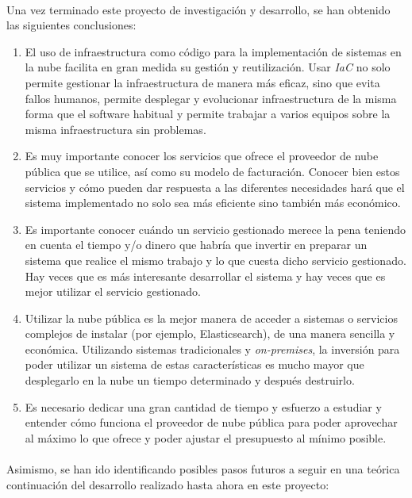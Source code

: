 \documentclass[../../memoria.tex]{subfiles}
\begin{document}
\paragraph{}
Una vez terminado este proyecto de investigación y desarrollo, se han obtenido las siguientes conclusiones:
\begin{enumerate}
    \item El uso de infraestructura como código para la implementación de sistemas en la nube facilita en gran medida su gestión y reutilización. Usar \textit{IaC} no solo permite gestionar la infraestructura de manera más eficaz, sino que evita fallos humanos, permite desplegar y evolucionar infraestructura de la misma forma que el software habitual y permite trabajar a varios equipos sobre la misma infraestructura sin problemas.

    \item Es muy importante conocer los servicios que ofrece el proveedor de nube pública que se utilice, así como su modelo de facturación. Conocer bien estos servicios y cómo pueden dar respuesta a las diferentes necesidades hará que el sistema implementado no solo sea más eficiente sino también más económico.

    \item Es importante conocer cuándo un servicio gestionado merece la pena teniendo en cuenta el tiempo y/o dinero que habría que invertir en preparar un sistema que realice el mismo trabajo y lo que cuesta dicho servicio gestionado. Hay veces que es más interesante desarrollar el sistema y hay veces que es mejor utilizar el servicio gestionado.

    \item Utilizar la nube pública es la mejor manera de acceder a sistemas o servicios complejos de instalar (por ejemplo, Elasticsearch), de una manera sencilla y económica. Utilizando sistemas tradicionales y \textit{on-premises}, la inversión para poder utilizar un sistema de estas características es mucho mayor que desplegarlo en la nube un tiempo determinado y después destruirlo.

    \item Es necesario dedicar una gran cantidad de tiempo y esfuerzo a estudiar y entender cómo funciona el proveedor de nube pública para poder aprovechar al máximo lo que ofrece y poder ajustar el presupuesto al mínimo posible.

\end{enumerate}

\paragraph{}
Asimismo, se han ido identificando posibles pasos futuros a seguir en una teórica continuación del desarrollo realizado hasta ahora en este proyecto:
\end{document}
